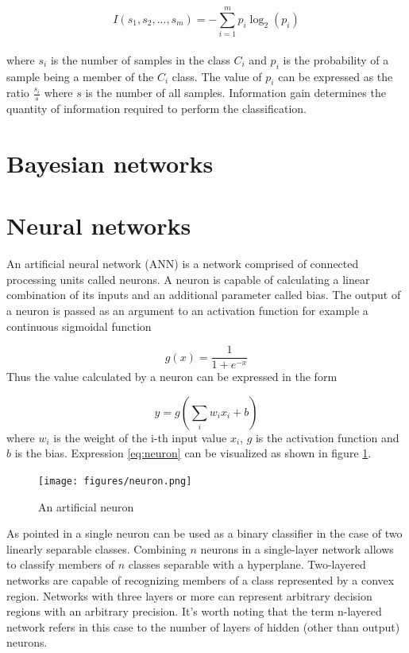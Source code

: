 \documentclass[11pt,oneside, a4paper]{report}
\begin{document}
\begin{equation} \label{eq:information-gain}
I(s_1, s_2, ..., s_m) = - \sum_{i=1}^{m} p_i \log_{2}(p_i)
\end{equation}
\\
where $s_i$ is the number of samples in the class $C_i$ and $p_i$ is the probability of a sample being a member of the $C_i$ class. The value of $p_i$ can be expressed as the ratio $\frac{s_i}{s}$ where $s$ is the number of all samples.
Information gain determines the quantity of information required to perform the classification. 


\section{Bayesian networks}
\section{Neural networks}
An artificial neural network (ANN) is a network comprised of connected processing units called neurons. A neuron is capable of calculating a linear combination of its inputs and an additional parameter called bias. The output of a neuron is passed as an argument to an activation function for example a continuous sigmoidal function

\begin{equation} \label{eq:sigmoid}
g(x) = \frac{1}{1 + e^{-x}}
\end{equation}
Thus the value calculated by a neuron can be expressed in the form

\begin{equation} \label{eq:neuron}
y = g(\sum_{i} w_i x_i + b)
\end{equation}
where $w_i$ is the weight of the i-th input value $x_i$, $g$ is the activation function and $b$ is the bias. Expression \ref{eq:neuron} can be visualized as shown in figure \ref{fig:neuron}.

\begin{figure}[htp]
\centering
\texttt{[image: figures/neuron.png]}
\caption{An artificial neuron}
\label{fig:neuron}
\end{figure}

As pointed in \cite{BISHOP1995} a single neuron can be used as a binary classifier in the case of two linearly separable classes. Combining $n$ neurons in a single-layer network allows to classify members of $n$ classes separable with a hyperplane. Two-layered networks are capable of recognizing members of a class represented by a convex region. Networks with three layers or more can represent arbitrary decision regions with an arbitrary precision.
It's worth noting that the term n-layered network refers in this case to the number of layers of hidden (other than output) neurons.
\end{document}
